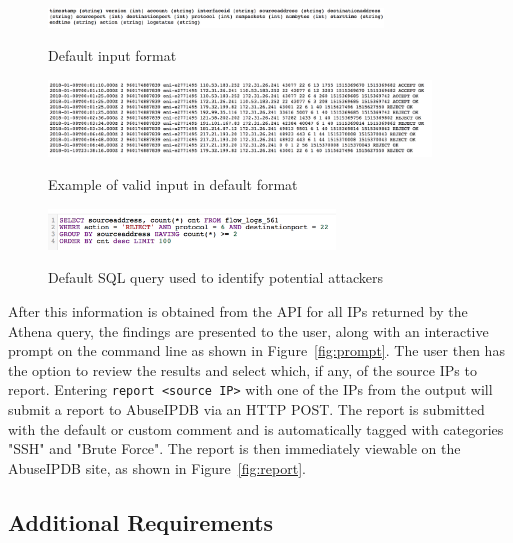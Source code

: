 \vspace{6em}

\begin{figure}[h]
{\includegraphics[width=3.5in]{./figures/561-default-format.png}}
\caption{\small{Default input format}}
\label{fig:input-format}
\end{figure}

\begin{figure}[h]
{\includegraphics[width=4in]{./figures/561-sample-input.png}}
\caption{\small{Example of valid input in default format}}
\label{fig:sample-input}
\end{figure}

\begin{figure}[H]
{\includegraphics[width=3in]{./figures/561-athena-query.png}}
\caption{\small{Default SQL query used to identify potential attackers}}
\label{fig:query}
\end{figure}

After this information is obtained from the API for all IPs returned by the Athena query, the findings are presented to the user, along with an interactive prompt on the command line as shown in Figure~\ref{fig:prompt}. The user then has the option to review the results and select which, if any, of the source IPs to report. Entering \texttt{report <source IP>} with one of the IPs from the output will submit a report to AbuseIPDB via an HTTP POST. The report is submitted with the default or custom comment and is automatically tagged with categories "SSH" and "Brute Force". The report is then immediately viewable on the AbuseIPDB site, as shown in Figure~\ref{fig:report}.

\subsection{Additional Requirements}

